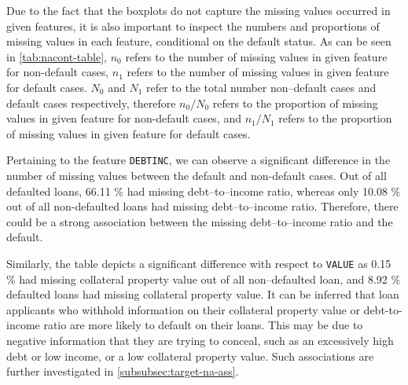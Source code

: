 Due to the fact that the boxplots do not capture the missing values occurred in given features, it is also important to inspect the numbers and proportions of missing values in each feature, conditional on the default status.
As can be seen in \autoref{tab:nacont-table}, $n_0$ refers to the number of missing values in given feature for non-default cases, $n_1$ refers to the number of missing values in given feature for default cases.
$N_0$ and $N_1$ refer to the total number non--default cases and default cases respectively, therefore $n_0/N_0$ refers to the proportion of missing values in given feature for non-default cases, and $n_1/N_1$ refers to the proportion of missing values in given feature for default cases.

Pertaining to the feature \texttt{DEBTINC}, we can observe a significant difference in the number of missing values between the default and non-default cases. Out of all defaulted loans, 66.11 \% had missing debt--to--income ratio, whereas only 10.08 \% out of all non-defaulted loans had missing debt--to--income ratio.
Therefore, there could be a strong association between the missing debt--to--income ratio and the default.

Similarly, the table depicts a significant difference with respect to \texttt{VALUE} as 0.15 \% had missing collateral property value out of all non--defaulted loan, and 8.92 \% defaulted loans had missing collateral property value.
It can be inferred that loan applicants who withhold information on their collateral property value or debt-to-income ratio are more likely to default on their loans.
This may be due to negative information that they are trying to conceal, such as an excessively high debt or low income, or a low collateral property value.
Such associations are further investigated in \autoref{subsubsec:target-na-ass}.


